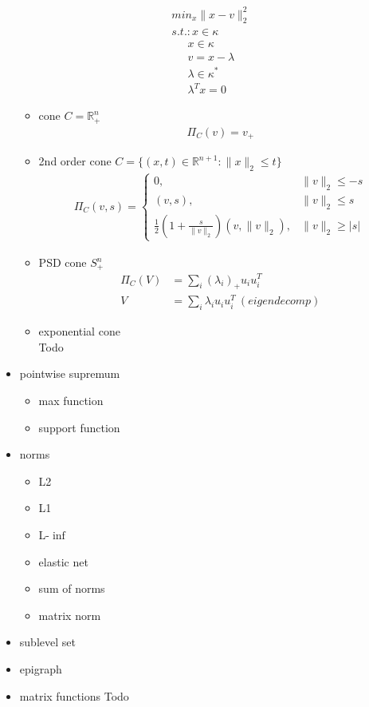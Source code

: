 \documentclass[8pt,letter]{article}
\newcommand{\R}{\mathbb{R}}
\begin{document}
\begin{multicols*}{2}
\begin{itemize}
\begin{align*}
      min_x \|x-v\|_2^2\\
      s.t.: x\in \kappa
    \end{align*}
    \begin{align*}
      x \in \kappa\\
      v=x-\lambda\\
      \lambda\in\kappa^*\\
      \lambda^Tx=0
    \end{align*}
    \begin{itemize}
    \item cone $C=\R_+^n$
      \begin{align*}
        \Pi_C(v)=v_+
      \end{align*}
    \item 2nd order cone $C=\{(x,t)\in \R^{n+1}: \|x\|_2 \leq t\}$
      \begin{align*}
        \Pi_C(v,s) = \begin{cases}
          0,& \|v\|_2 \leq -s\\
          (v,s),& \|v\|_2 \leq s\\
          \frac{1}{2}(1+\frac{s}{\|v\|_2})(v,\|v\|_2),& \|v\|_2 \geq |s|
        \end{cases}
      \end{align*}
    \item PSD cone $S_+^n$
      \begin{align*}
        \Pi_C(V)&=\sum_i (\lambda_i)_+ u_i u_i^T\\
        V&=\sum_i \lambda_i u_i u_i^T\ (eigendecomp)
      \end{align*}
    \item exponential cone\\
      Todo
    \end{itemize}
  \item pointwise supremum
    \begin{itemize}
    \item max function
    \item support function
    \end{itemize}
  \item norms
    \begin{itemize}
    \item L2
    \item L1
    \item L-$\inf$
    \item elastic net
    \item sum of norms
    \item matrix norm
    \end{itemize}
  \item sublevel set
  \item epigraph
  \item matrix functions
    Todo
  \end{itemize}


\end{multicols*}
\end{document}
